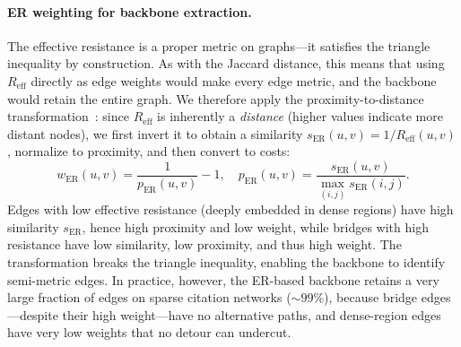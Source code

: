 \documentclass[conference]{IEEEtran}
\begin{document}
\paragraph{ER weighting for backbone extraction.} The effective resistance is a proper metric on graphs---it satisfies the triangle inequality by construction. As with the Jaccard distance, this means that using $R_{\text{eff}}$ directly as edge weights would make every edge metric, and the backbone would retain the entire graph. We therefore apply the proximity-to-distance transformation~\cite{simas2021}: since $R_{\text{eff}}$ is inherently a \emph{distance} (higher values indicate more distant nodes), we first invert it to obtain a similarity $s_{\text{ER}}(u,v) = 1 / R_{\text{eff}}(u,v)$, normalize to proximity, and then convert to costs:
\begin{equation}
    w_{\text{ER}}(u, v) = \frac{1}{p_{\text{ER}}(u, v)} - 1, \quad p_{\text{ER}}(u,v) = \frac{s_{\text{ER}}(u,v)}{\max_{(i,j)} s_{\text{ER}}(i,j)}.
    \label{eq:er_weight}
\end{equation}
Edges with low effective resistance (deeply embedded in dense regions) have high similarity $s_{\text{ER}}$, hence high proximity and low weight, while bridges with high resistance have low similarity, low proximity, and thus high weight. The transformation breaks the triangle inequality, enabling the backbone to identify semi-metric edges. In practice, however, the ER-based backbone retains a very large fraction of edges on sparse citation networks (${\sim}99\%$), because bridge edges---despite their high weight---have no alternative paths, and dense-region edges have very low weights that no detour can undercut.
\end{document}
